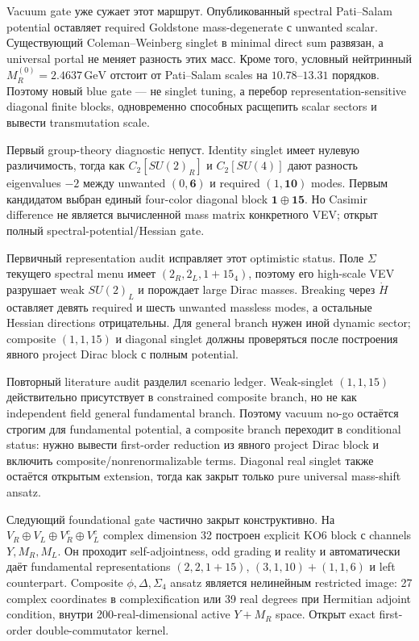 Vacuum gate уже сужает этот маршрут. Опубликованный spectral Pati--Salam
potential оставляет required Goldstone mass-degenerate с unwanted scalar.
Существующий Coleman--Weinberg singlet в minimal direct sum развязан, а
universal portal не меняет разность этих масс. Кроме того, условный
нейтринный \(M_R^{(0)}=2.4637\,\mathrm{GeV}\) отстоит от Pati--Salam
scales на \(10.78\)--\(13.31\) порядков. Поэтому новый blue gate --- не
singlet tuning, а перебор representation-sensitive diagonal finite blocks,
одновременно способных расщепить scalar sectors и вывести transmutation
scale.

Первый group-theory diagnostic непуст. Identity singlet имеет нулевую
различимость, тогда как \(C_2[SU(2)_R]\) и \(C_2[SU(4)]\) дают разность eigenvalues
\(-2\) между unwanted \((0,\mathbf6)\) и required
\((1,\mathbf{10})\) modes. Первым кандидатом выбран единый four-color
diagonal block \(\mathbf1\oplus\mathbf{15}\). Но Casimir difference не
является вычисленной mass matrix конкретного VEV; открыт полный
spectral-potential/Hessian gate.

Первичный representation audit исправляет этот optimistic status. Поле
\(\Sigma\) текущего spectral menu имеет
\((2_R,2_L,1+15_4)\), поэтому его high-scale VEV разрушает weak
\(SU(2)_L\) и порождает large Dirac masses. Breaking через \(\dot H\)
оставляет девять required и шесть unwanted massless modes, а остальные
Hessian directions отрицательны. Для general branch нужен иной dynamic
sector; composite \((1,1,15)\) и diagonal singlet должны проверяться после
построения явного project Dirac block с полным potential.

Повторный literature audit разделил scenario ledger. Weak-singlet
\((1,1,15)\) действительно присутствует в constrained composite branch,
но не как independent field general fundamental branch. Поэтому vacuum
no-go остаётся строгим для fundamental potential, а composite branch
переходит в conditional status: нужно вывести first-order reduction из
явного project Dirac block и включить composite/nonrenormalizable terms.
Diagonal real singlet также остаётся открытым extension, тогда как закрыт
только pure universal mass-shift ansatz.

Следующий foundational gate частично закрыт конструктивно. На
\(V_R\oplus V_L\oplus V_R^c\oplus V_L^c\) complex dimension 32 построен
explicit KO6 block с channels \(Y,M_R,M_L\). Он проходит self-adjointness,
odd grading и reality и автоматически даёт fundamental representations
\((2,2,1+15)\), \((3,1,10)+(1,1,6)\) и left counterpart. Composite
\(\phi,\Delta,\Sigma_4\) ansatz является нелинейным restricted image:
27 complex coordinates в complexification или 39 real degrees при
Hermitian adjoint condition, внутри 200-real-dimensional active
\(Y+M_R\) space. Открыт exact
first-order double-commutator kernel.

